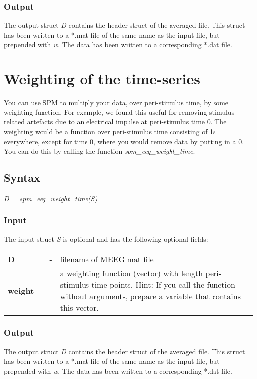 \subsubsection{Output}
The output struct {\it D} contains the header struct of the averaged
file. This struct has been written to a *.mat file of the same name as
the input file, but prepended with {\it w}. The data has been
written to a corresponding *.dat file.

\section{Weighting of the time-series}
You can use SPM to multiply your
data, over peri-stimulus time, by some weighting function. For
example, we found this useful for removing stimulus-related artefacts
due to an electrical impulse at peri-stimulus time 0. The weighting
would be a function over peri-stimulus time consisting of 1s
everywhere, except for time 0, where you would remove data by putting
in a 0. You can do this by calling the function
\textit{spm\_eeg\_weight\_time}. 

\subsection{Syntax}
\textit{D = spm\_eeg\_weight\_time(S)}
\\

\subsubsection{Input}
The input struct {\it S} is optional and has the following optional fields:

\begin{tabular}{llcp{9cm}}
{\bf D} & & - & filename of MEEG mat file\\
{\bf weight} & & - & a weighting function (vector) with length peri-stimulus
time points. Hint: If you call the function without arguments, prepare a
variable that contains this vector.
\end{tabular}

\subsubsection{Output}
The output struct {\it D} contains the header struct of the averaged
file. This struct has been written to a *.mat file of the same name as
the input file, but prepended with {\it w}. The data has been
written to a corresponding *.dat file.

